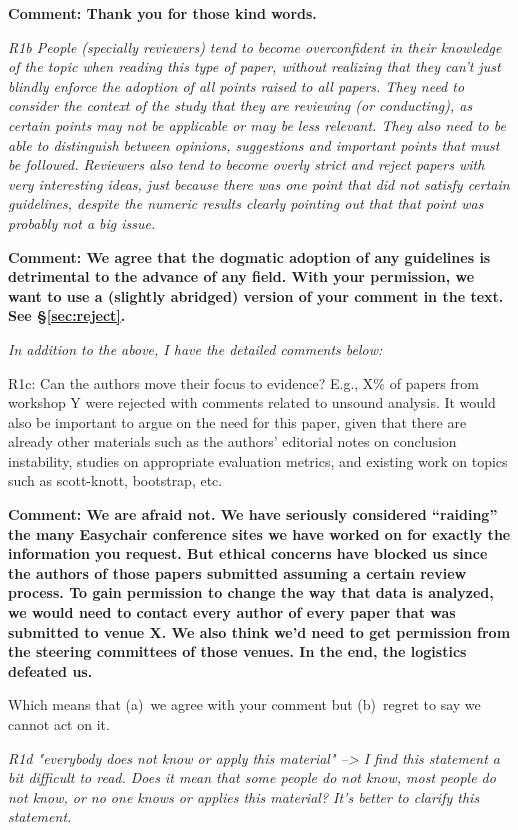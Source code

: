 {\bf Comment: Thank you for those kind words.}



{\em 
R1b People (specially reviewers) tend to become overconfident in their knowledge of the topic when reading this type of paper, without realizing that they can't just blindly enforce the adoption of all points raised to all papers. They need to consider the context of the study that they are reviewing (or conducting), as certain points may not be applicable or may be less relevant. They also need to be able to distinguish between opinions, suggestions and important points that must be followed. Reviewers also tend to become overly strict and reject papers with very interesting ideas, just because there was one point that did not satisfy certain guidelines, despite the numeric results clearly pointing out that that point was probably not a big issue.}

{\bf Comment: We agree that the dogmatic adoption of any guidelines is detrimental to the advance of any field.
With your permission, we want to use a (slightly abridged) version of your comment in the text.
See \S\vref{sec:reject}.}

{\em In addition to the above, I have the detailed comments below:

R1c:  Can the authors move their focus to evidence? E.g., X\% of papers from workshop Y were rejected with comments related to unsound analysis. It would also be important to argue on the need for this paper, given that there are already other materials such as the authors' editorial notes on conclusion instability, studies on appropriate evaluation metrics, and existing work on topics such as scott-knott, bootstrap, etc.}

{\bf Comment: We are afraid not.  We have seriously considered ``raiding'' the many Easychair conference sites we have worked on for exactly the information you request. But ethical concerns have blocked us since the authors of those papers submitted assuming a certain review process. To gain permission to change the way that data is analyzed,  we would need to contact every author of every paper that was submitted to venue X. We also think we'd need to get permission from the steering committees of those venues. In the end, the logistics defeated us. 

Which means that (a)~we agree with your comment but (b)~regret to say we cannot act on it.}

{\em R1d "everybody does not know or apply this material" --> I find this statement a bit difficult to read. Does it mean that some people do not know, most people do not know, or no one knows or applies this material? It's better to clarify this statement.}

